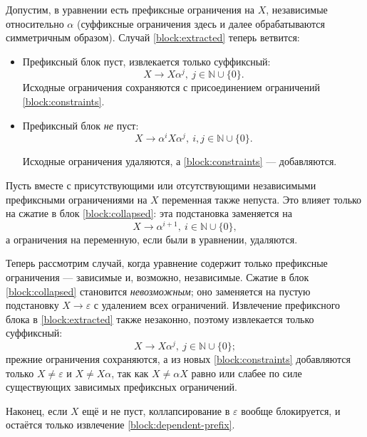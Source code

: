 \documentclass[12pt]{article}
\begin{document}
Допустим, в уравнении есть префиксные ограничения на $X$, независимые
относительно $\alpha$ (суффиксные ограничения здесь и далее обрабатываются
симметричным образом). Случай \eqref{block:extracted} теперь ветвится:
\begin{itemize}
  \item Префиксный блок пуст, извлекается только суффиксный:
  \begin{displaymath}
    X \to X \alpha^j, \ j \in \mathbb{N} \cup \{ 0 \}.
  \end{displaymath}
  Исходные ограничения сохраняются с присоединением ограничений
  \eqref{block:constraints}.
  
  \item Префиксный блок \textit{не} пуст:
  \begin{displaymath}
    X \to \alpha^i X \alpha^j, \ i, j \in \mathbb{N} \cup \{ 0 \}.
  \end{displaymath}

  Исходные ограничения удаляются, а \eqref{block:constraints} ---
  добавляются.
\end{itemize}

Пусть вместе с присутствующими или отсутствующими независимыми префиксными
ограничениями на $X$ переменная также непуста. Это влияет только на сжатие
в блок \eqref{block:collapsed}: эта подстановка заменяется на
\begin{equation} \label{block:non-empty-collapsed}
  X \to \alpha^{i + 1}, \ i \in \mathbb{N} \cup \{ 0 \},
\end{equation}
а ограничения на переменную, если были в уравнении, удаляются.

Теперь рассмотрим случай, когда уравнение содержит только префиксные
ограничения --- зависимые и, возможно, независимые. Сжатие в блок
\eqref{block:collapsed} становится \textit{невозможным}; оно заменяется на
пустую подстановку $X \to \varepsilon$ с удалением всех ограничений. Извлечение
префиксного блока в \eqref{block:extracted} также незаконно, поэтому
извлекается только суффиксный:
\begin{equation} \label{block:dependent-prefix}
  X \to X \alpha^j, \ j \in \mathbb{N} \cup \{ 0 \};
\end{equation}
прежние ограничения сохраняются, а из новых \eqref{block:constraints}
добавляются только $X \ne \varepsilon$ и $X \ne X \alpha$, так как $X \ne
\alpha X$ равно или слабее по силе существующих зависимых префиксных
ограничений.

Наконец, если $X$ ещё и не пуст, коллапсирование в $\varepsilon$ вообще
блокируется, и остаётся только извлечение \eqref{block:dependent-prefix}.
\end{document}
